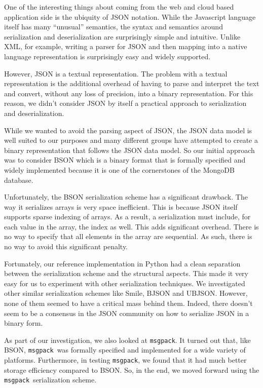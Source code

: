 \documentclass[11pt,a4paper,twocolumn]{article}
\newcommand{\msgpack}{\texttt{msgpack}}
\begin{document}
One of the interesting things about coming from the web and cloud
based application side is the ubiquity of JSON notation.  While the
Javascript language itself has many ``unusual'' semantics, the syntax
and semantics around serialization and deserialization are
surprisingly simple and intuitive.  Unlike XML, for example, writing a
parser for JSON and then mapping into a native language representation
is surprisingly easy and widely supported.

However, JSON is a textual representation.  The problem with a textual
representation is the additional overhead of having to parse and
interpret the text and convert, without any loss of precision, into a
binary representation.  For this reason, we didn't consider JSON by
itself a practical approach to serialization and deserialization.

While we wanted to avoid the parsing aspect of JSON, the JSON data
model \cite{JSON} is well suited to our purposes and many different
groups have attempted to create a binary representation that follows
the JSON data model.  So our initial approach was to consider BSON
\cite{BSON} which is a binary format that is formally specified and
widely implemented because it is one of the cornerstones of the
MongoDB database\cite{MongoDB}.

Unfortunately, the BSON serialization scheme has a significant
drawback.  The way it serializes arrays is very space inefficient.
This is because JSON itself supports sparse indexing of arrays.  As a
result, a serialization must include, for each value in the array, the
index as well.  This adds significant overhead.  There is no way to
specify that all elements in the array are sequential.  As such, there
is no way to avoid this significant penalty.

Fortunately, our reference implementation in Python\cite{pyRecon} had
a clean separation between the serialization scheme and the structural
aspects.  This made it very easy for us to experiment with other
serialization techniques.  We investigated other similar serialization
schemes like Smile\cite{Smile}, BJSON\cite{BJSON} and
UBJSON\cite{UBJSON}.  However, none of them seemed to have a critical
mass behind them.  Indeed, there doesn't seem to be a consensus in the
JSON community on how to serialize JSON in a binary form.

As part of our investigation, we also looked at \msgpack.  It turned
out that, like BSON, \msgpack\ was formally specified and implemented
for a wide variety of platforms\cite{MsgPack}.  Furthermore, in
testing \msgpack, we found that it had much better storage efficiency
compared to BSON.  So, in the end, we moved forward using the
\msgpack\ serialization scheme.
\end{document}
